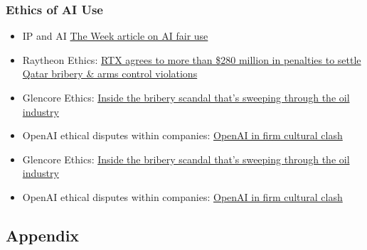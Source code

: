 \documentclass[
  11pt,
]{article}
\providecommand{\tightlist}{%
  \setlength{\itemsep}{0pt}\setlength{\parskip}{0pt}}
\begin{document}
\subsubsection{Ethics of AI Use}\label{ethics-of-ai-use}

\begin{itemize}
\tightlist
\item
  IP and AI
  \href{https://theweek.com/tech/ai-fair-use-copyrighted-media-trains-bots}{The
  Week article on AI fair use}
\item
  Raytheon Ethics:
  \href{https://www.wsj.com/articles/rtx-agrees-to-more-than-280-million-in-penalties-to-settle-qatar-bribery-arms-control-violations-7368bf98?gaa_at=eafs&gaa_n=ASWzDAiE1z_s4buplQHYLUrzC8wR7x8ZeyDpQfmuQ1jNPC2pP_Jlvzp55qq7&gaa_sig=iVMI5Rj_kpBXM3-jcEi7EpdJeDq0X_0rZKIZSXoRcXHd1lx16d508-WH2zXsQ0gzXTPNK5K8Jg6y84RgOOK_IQ\%3D\%3D&gaa_ts=688be7a3}{RTX
  agrees to more than \$280 million in penalties to settle Qatar bribery
  \& arms control violations}
\item
  Glencore Ethics:
  \href{https://www.wsj.com/articles/inside-the-bribery-scandal-thats-sweeping-through-the-oil-industry-1518543648?gaa_at=eafs&gaa_n=ASWzDAjonC0ZvhOArbiu8fQmhaoIAPVBIEzyrt6edgKhfrs68TM_sYuKhM5b&gaa_sig=QXWvAA2pGRTO0SMy3UziYWQM3VHC4AgG7DTH-45eimDi-Yb7zFq2Z069trhFEsfSzIxNZ985EXf6nfVzo_nRKg\%3D\%3D&gaa_ts=688be7a3}{Inside
  the bribery scandal that's sweeping through the oil industry}
\item
  OpenAI ethical disputes within companies:
  \href{https://archive.ph/rR3Gt\#selection-565.3-593.46}{OpenAI in firm
  cultural clash}
\item
  Glencore Ethics:
  \href{https://www.wsj.com/articles/inside-the-bribery-scandal-thats-sweeping-through-the-oil-industry-1518543648?gaa_at=eafs&gaa_n=ASWzDAjonC0ZvhOArbiu8fQmhaoIAPVBIEzyrt6edgKhfrs68TM_sYuKhM5b&gaa_sig=QXWvAA2pGRTO0SMy3UziYWQM3VHC4AgG7DTH-45eimDi-Yb7zFq2Z069trhFEsfSzIxNZ985EXf6nfVzo_nRKg\%3D\%3D&gaa_ts=688be7a3}{Inside
  the bribery scandal that's sweeping through the oil industry}
\item
  OpenAI ethical disputes within companies:
  \href{https://archive.ph/rR3Gt\#selection-565.3-593.46}{OpenAI in firm
  cultural clash}
\end{itemize}

\subsection{Appendix}\label{appendix}
\end{document}
